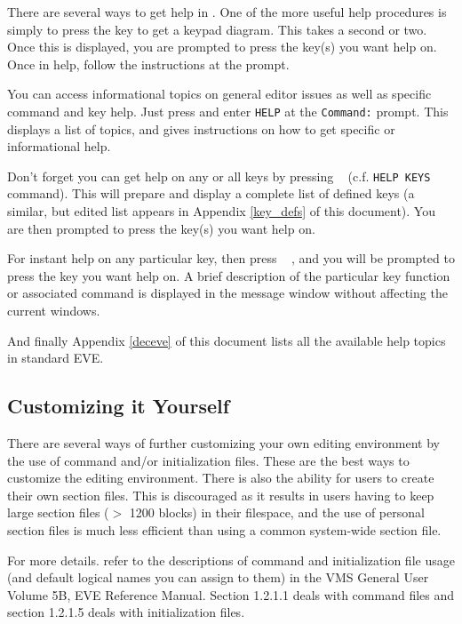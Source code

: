 There are several ways to get help in \STEve. One of the more useful help
procedures is simply to press the  key to get a keypad diagram.
This takes a second or two. Once this is displayed, you are prompted to press
the key(s) you want help on. Once in help, follow the instructions at the
prompt.

You can access informational topics on general editor issues as well as
specific command and key help. Just press  and enter {\tt HELP} at
the {\tt Command:} prompt. This displays a list of topics, and gives
instructions on how to get specific or informational help.

Don't forget you can get help on any or all keys by pressing
\gold\  (c.f. {\tt HELP KEYS} command). This will prepare and
display a complete list of defined keys (a similar, but edited list appears in
Appendix \ref{key_defs} of this document). You are then prompted to press the
key(s) you want help on.

For instant help on any particular key, then press \gold\  , and
you will be prompted to press the key you want help on. A brief description of
the particular key function or associated command is displayed in the message
window without affecting the current windows.

And finally Appendix \ref{deceve} of this document lists all the available
help topics in standard EVE.

\subsection{Customizing it Yourself}

There are several ways of further customizing your own editing environment by
the use of command and/or initialization files. These are the best ways to
customize the editing environment. There is also the ability for users to
create their own section files. This is discouraged as it results in users
having to keep large section files ($>$ 1200 blocks) in their filespace, and
the use of personal section files is much less efficient than using a common
system-wide section file.

For more details. refer to the descriptions of command and initialization file
usage (and default logical names you can assign to them) in the VMS General
User Volume 5B, EVE Reference Manual. Section 1.2.1.1 deals with command files
and section 1.2.1.5 deals with initialization files.

\newpage

